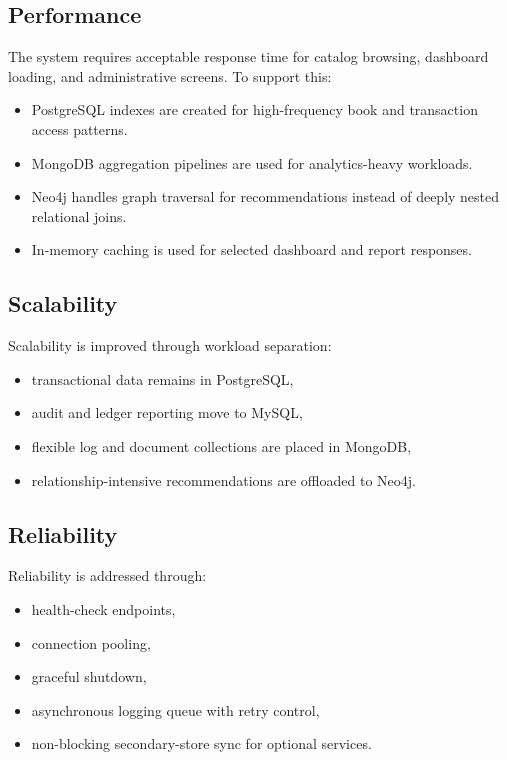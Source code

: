 \documentclass[12pt,a4paper]{report}
\begin{document}
\subsection{Performance}
The system requires acceptable response time for catalog browsing, dashboard loading, and administrative screens. To support this:
\begin{itemize}[leftmargin=1.5em]
    \item PostgreSQL indexes are created for high-frequency book and transaction access patterns.
    \item MongoDB aggregation pipelines are used for analytics-heavy workloads.
    \item Neo4j handles graph traversal for recommendations instead of deeply nested relational joins.
    \item In-memory caching is used for selected dashboard and report responses.
\end{itemize}

\subsection{Scalability}
Scalability is improved through workload separation:
\begin{itemize}[leftmargin=1.5em]
    \item transactional data remains in PostgreSQL,
    \item audit and ledger reporting move to MySQL,
    \item flexible log and document collections are placed in MongoDB,
    \item relationship-intensive recommendations are offloaded to Neo4j.
\end{itemize}

\subsection{Reliability}
Reliability is addressed through:
\begin{itemize}[leftmargin=1.5em]
    \item health-check endpoints,
    \item connection pooling,
    \item graceful shutdown,
    \item asynchronous logging queue with retry control,
    \item non-blocking secondary-store sync for optional services.
\end{itemize}
\end{document}
